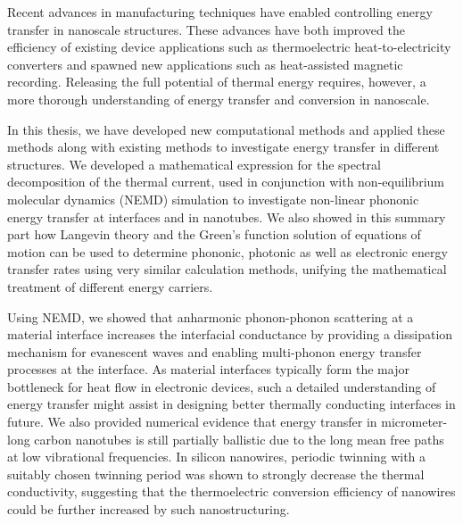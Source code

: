 
Recent advances in manufacturing techniques have enabled controlling energy transfer in nanoscale structures. These advances have both improved the efficiency of existing device applications such as thermoelectric heat-to-electricity converters and spawned new applications such as heat-assisted magnetic recording. Releasing the full potential of thermal energy requires, however, a more thorough understanding of energy transfer and conversion in nanoscale.


In this thesis, we have developed new computational methods and applied these methods along with existing methods to investigate energy transfer in different structures. We developed a mathematical expression for the spectral decomposition of the thermal current, used in conjunction with non-equilibrium molecular dynamics (NEMD) simulation to investigate non-linear phononic energy transfer at interfaces and in nanotubes. We also showed in this summary part how Langevin theory and the Green's function solution of equations of motion can be used to determine phononic, photonic as well as electronic energy transfer rates using very similar calculation methods, unifying the mathematical treatment of different energy carriers. %

Using NEMD, we showed that anharmonic phonon-phonon scattering at a material interface increases the interfacial conductance by providing a dissipation mechanism for evanescent waves and enabling multi-phonon energy transfer processes at the interface. As material interfaces typically form the major bottleneck for heat flow in electronic devices, such a detailed understanding of energy transfer might assist in designing better thermally conducting interfaces in future. We also provided numerical evidence that energy transfer in micrometer-long carbon nanotubes is still partially ballistic due to the long mean free paths at low vibrational frequencies. In silicon nanowires, periodic twinning with a suitably chosen twinning period was shown to strongly decrease the thermal conductivity, suggesting that the thermoelectric conversion efficiency of nanowires could be further increased by such nanostructuring. 





